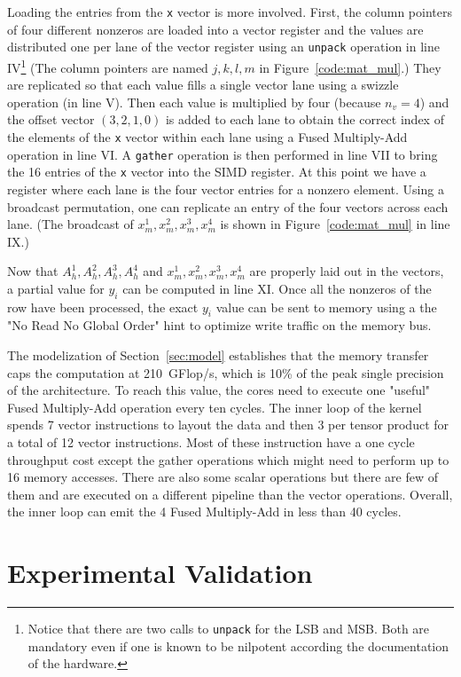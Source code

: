 \documentclass{sig-alternate}
\def\ee#1{{#1}}
\begin{document}
Loading the entries from the {\tt x} vector is  more
involved. First, the column pointers of four different nonzeros are
loaded into a vector register and the values are distributed one per
lane of the vector register using an {\tt unpack}
operation in line IV\footnote{Notice that there are two calls to {\tt unpack} for the
LSB and MSB. Both are mandatory even if one is known to be
nilpotent according the documentation of the hardware.} (The column
pointers are named $j,k,l,m$ in Figure~\ref{code:mat_mul}.) They
are replicated so that each value fills a single vector lane 
using a swizzle operation (in line V). Then each value is multiplied by four
(because $n_v=4$) 
and the offset vector $(3,2,1,0)$ is added to each lane to obtain the
correct index of the elements of the {\tt x} vector within each lane
using a Fused Multiply-Add operation in line VI. A {\tt gather} operation is then
performed in line VII to bring the 16 entries of the {\tt x} vector into the SIMD
register. At this point we have a register where each lane is the
four vector entries for a nonzero element. Using a broadcast
permutation, one can replicate an entry of the four vectors across
each lane. (The broadcast of $x_m^1,x_m^2,x_m^3,x_m^4$ is shown in
Figure~\ref{code:mat_mul} in line IX.)

Now that $A_h^1,A_h^2,A_h^3,A_h^4$ and $x_m^1,x_m^2,x_m^3,x_m^4$ are
properly laid out in the vectors, a partial value for $y_i$ can be
computed in line XI. Once all the nonzeros of the row have been processed, the
exact $y_i$ value can be sent to memory using a the "No Read No Global
Order" hint to optimize write traffic on the memory bus.

\ee{The modelization of Section~\ref{sec:model} establishes that the 
  memory
  transfer caps the computation at 210~GFlop/s, which is 10\% of the
  peak single precision of the architecture. To reach this value, the
  cores need to execute one "useful" Fused Multiply-Add operation
  every ten cycles. The inner loop of the kernel spends 7 vector
  instructions to layout the data and then 3 per tensor product for a
  total of 12 vector instructions. Most of these instruction have a
  one cycle throughput cost except the gather operations which might
  need to perform up to 16 memory accesses. There are also some scalar
  operations but there are few of them and are executed on a different
  pipeline than the vector operations. Overall, the inner loop can
  emit the 4 Fused Multiply-Add in less than 40 cycles.}

\section{Experimental Validation}
\label{sec:expe}
\end{document}
